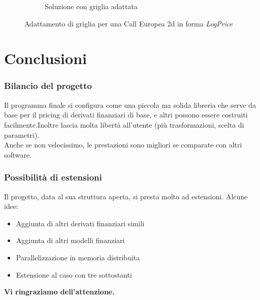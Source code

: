 \documentclass{beamer}
\begin{document}
\begin{frame}[c]
\begin{figure}
\begin{subfigure}{0.48\linewidth}
{  \caption{Soluzione con griglia adattata}}
 \end{subfigure}
 \caption{Adattamento di griglia per una Call Europea 2d in forma \emph{LogPrice}}
 \end{figure}
\end{frame}


\section{Conclusioni}

\begin{frame}
 \frametitle{Bilancio del progetto}
Il programma finale si configura come una piccola ma solida libreria che serve da base per il pricing di derivati finanziari di base, e altri possono essere costruiti facilmente.Inoltre lascia molta libertà all'utente (più trasformazioni, scelta di parametri).\\ \vspace{1cm}
Anche se non velocissimo, le prestazioni sono migliori se comparate con altri software. 
\end{frame}


\begin{frame}
 \frametitle{Possibilità di estensioni}
 
 Il progetto, data al sua struttura aperta, si presta molto ad estensioni. Alcune idee:
 \begin{itemize}[<+->]
  \item Aggiunta di altri derivati finanziari simili
  \item Aggiunta di altri modelli finanziari
  \item Parallelizzazione in memoria distribuita
  \item Estensione al caso con tre sottostanti
 \end{itemize}

 
\end{frame}



\begin{frame}[plain]
\centering
 \bf{\LARGE Vi ringraziamo dell'attenzione.}\\
\end{frame}
\end{document}
